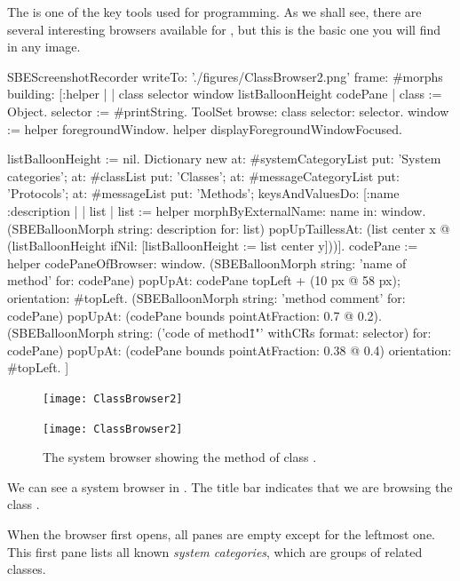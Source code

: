 \documentclass[a4paper,10pt,twoside]{book}
\begin{document}
The  is one of the key tools used for programming.
As we shall see, there are several interesting browsers available for \sq, but this is the basic one you will find in any image.


\begin{ExecuteSmalltalkScript}
SBEScreenshotRecorder writeTo: './figures/ClassBrowser2.png' frame: #morphs building: [:helper |
	| class selector window listBalloonHeight codePane |
	class := Object. selector := #printString.
	ToolSet browse: class selector: selector.
	window := helper foregroundWindow.
	helper displayForegroundWindowFocused.

	listBalloonHeight := nil.
	Dictionary new
		at: #systemCategoryList put: 'System categories';
		at: #classList put: 'Classes';
		at: #messageCategoryList put: 'Protocols';
		at: #messageList put: 'Methods';
		keysAndValuesDo: [:name :description |
			| list |
			list := helper morphByExternalName: name in: window.
			(SBEBalloonMorph string: description for: list)
				popUpTaillessAt: (list center x @ (listBalloonHeight ifNil: [listBalloonHeight := list center y]))].
	codePane := helper codePaneOfBrowser: window.
	(SBEBalloonMorph string: 'name of method' for: codePane)
		popUpAt: codePane topLeft + (10 px @ 58 px);
		orientation: #topLeft.
	(SBEBalloonMorph string: 'method comment' for: codePane)
		popUpAt: (codePane bounds pointAtFraction: 0.7 @ 0.2).
	(SBEBalloonMorph
		string: ('code of method\"{1}"' withCRs format: {selector})
		for: codePane)
		popUpAt: (codePane bounds pointAtFraction: 0.38 @ 0.4)
		orientation: #topLeft.
]
\end{ExecuteSmalltalkScript}
\begin{figure}[htb]
\ifluluelse
	{\centerline {\texttt{[image: ClassBrowser2]}}}
	{\centerline {\texttt{[image: ClassBrowser2]}}}
\caption{The system browser showing the  method of class .
\label{fig:classBrowser}}
\end{figure}

We can see a system browser in .
The title bar indicates that we are browsing the class .

When the browser first opens, all panes are empty except for the leftmost one.
This first pane lists all known \emph{system categories}, which are groups of related classes.
\end{document}
